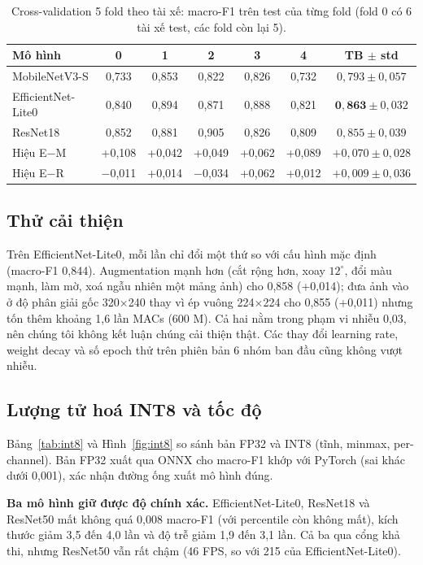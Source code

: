 \documentclass[10pt,a4paper,twocolumn]{article}
\begin{document}
\begin{table}[t]
\centering\small
\caption{Cross-validation 5 fold theo tài xế: macro-F1 trên test của từng fold (fold 0 có 6 tài xế test, các fold còn lại 5).}
\label{tab:cv}
\setlength{\tabcolsep}{3pt}
\begin{tabular}{@{}lccccc c@{}}
\toprule
Mô hình & 0 & 1 & 2 & 3 & 4 & TB $\pm$ std \\
\midrule
MobileNetV3-S & 0,733 & 0,853 & 0,822 & 0,826 & 0,732 & $0{,}793 \pm 0{,}057$ \\
EfficientNet-Lite0 & 0,840 & 0,894 & 0,871 & 0,888 & 0,821 & $\mathbf{0{,}863} \pm 0{,}032$ \\
ResNet18 & 0,852 & 0,881 & 0,905 & 0,826 & 0,809 & $0{,}855 \pm 0{,}039$ \\
\midrule
Hiệu E$-$M & +0,108 & +0,042 & +0,049 & +0,062 & +0,089 & $+0{,}070 \pm 0{,}028$ \\
Hiệu E$-$R & $-$0,011 & +0,014 & $-$0,034 & +0,062 & +0,012 & $+0{,}009 \pm 0{,}036$ \\
\bottomrule
\end{tabular}
\end{table}

\subsection{Thử cải thiện}
Trên EfficientNet-Lite0, mỗi lần chỉ đổi một thứ so với cấu hình mặc định (macro-F1 0,844). Augmentation mạnh hơn (cắt rộng hơn, xoay $12^\circ$, đổi màu mạnh, làm mờ, xoá ngẫu nhiên một mảng ảnh) cho 0,858 (+0,014); đưa ảnh vào ở độ phân giải gốc 320$\times$240 thay vì ép vuông 224$\times$224 cho 0,855 (+0,011) nhưng tốn thêm khoảng 1,6 lần MACs (600 M). Cả hai nằm trong phạm vi nhiễu 0,03, nên chúng tôi không kết luận chúng cải thiện thật. Các thay đổi learning rate, weight decay và số epoch thử trên phiên bản 6 nhóm ban đầu cũng không vượt nhiễu.

\subsection{Lượng tử hoá INT8 và tốc độ}
Bảng~\ref{tab:int8} và Hình~\ref{fig:int8} so sánh bản FP32 và INT8 (tĩnh, minmax, per-channel). Bản FP32 xuất qua ONNX cho macro-F1 khớp với PyTorch (sai khác dưới 0,001), xác nhận đường ống xuất mô hình đúng.

\textbf{Ba mô hình giữ được độ chính xác.} EfficientNet-Lite0, ResNet18 và ResNet50 mất không quá 0,008 macro-F1 (với percentile còn không mất), kích thước giảm 3,5 đến 4,0 lần và độ trễ giảm 1,9 đến 3,1 lần. Cả ba qua cổng khả thi, nhưng ResNet50 vẫn rất chậm (46 FPS, so với 215 của EfficientNet-Lite0).
\end{document}
